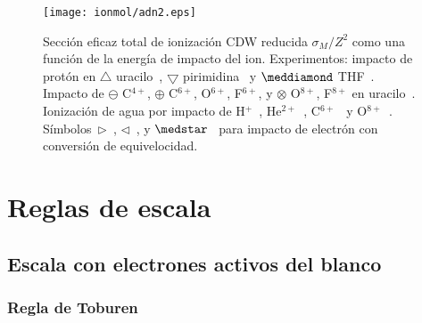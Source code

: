 \begin{figure}
\centering
\texttt{[image: ionmol/adn2.eps]}
\caption[Sección eficaz total de ionización reducida por $Z$ (Parte II).]
{Sección eficaz total de ionización CDW reducida $\sigma_{M}/Z^2$ como 
una función de la energía de impacto del ion. Experimentos: impacto de 
protón en $\triangle$ uracilo~\cite{itoh2013}, 
$\bigtriangledown$ pirimidina~\cite{wolff2014} y 
$\meddiamond$ THF~\cite{wang2016}. 
Impacto de $\ominus$ C$^{4+}$, $\oplus$ C$^{6+}$, O$^{6+}$, F$^{6+}$, y 
$\otimes$ O$^{8+}$, F$^{8+}$ en uracilo~\cite{agnihotri2012,agnihotri2013}. 
Ionización de agua por impacto de H$^+$~\cite{Luna2007,Bolorizadeh86,H_Rudd85,
toburen80}, He$^{2+}$~\cite{Ohsawa05,He_Rudd85,toburen80}, 
C$^{6+}$~\cite{DalCappello2009,Bhattacharjee17} y 
O$^{8+}$~\cite{Tribedi_O_water}. 
Símbolos~$\rhd$~\cite{bug2017}, $\lhd$~\cite{wolf2019}, y 
$\medstar$~\cite{fuss2009} para impacto de electrón con conversión de 
equivelocidad.}
\label{fig:crossDNA_2}
\end{figure} 

\section{Reglas de escala}
\label{sec:scaling}

\subsection{Escala con electrones activos del blanco}
\label{subsec:ne_scaling}

\subsubsection{Regla de Toburen}
\label{subsec:toburen}

